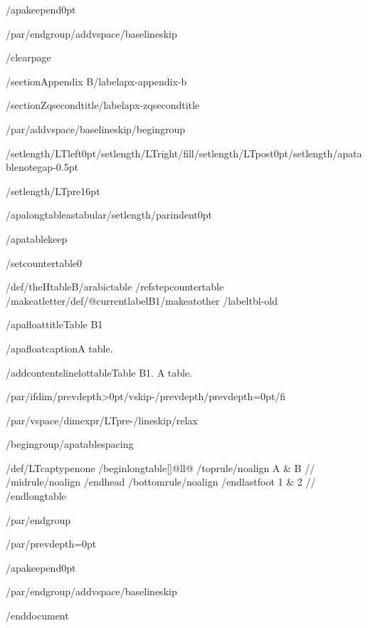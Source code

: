 /apakeepend{0pt}

/par/endgroup/addvspace{/baselineskip}

/clearpage

/section{Appendix B}/label{apx-appendix-b}

/section{Zqsecondtitle}/label{apx-zqsecondtitle}

/par/addvspace{/baselineskip}/begingroup

/setlength{/LTleft}{0pt}/setlength{/LTright}{/fill}/setlength{/LTpost}{0pt}/setlength{/apatablenotegap}{-0.5pt}

/setlength{/LTpre}{16pt}

/apalongtableastabular/setlength{/parindent}{0pt}

/apatablekeep

/setcounter{table}{0}

/def/theHtable{B/arabic{table}}%
/refstepcounter{table}%
/makeatletter/def/@currentlabel{B1}/makeatother%
/label{tbl-old}

/apafloattitle{Table B1}

/apafloatcaption{A table.}

/addcontentsline{lot}{table}{Table B1. A table.}

/par/ifdim/prevdepth>0pt/vskip-/prevdepth/prevdepth=0pt/fi

/par/vspace{/dimexpr/LTpre-/lineskip/relax}

/begingroup/apatablespacing

{/def/LTcaptype{none} %
/begin{longtable}[]{@{}ll@{}}
/toprule/noalign{}
A & B //
/midrule/noalign{}
/endhead
/bottomrule/noalign{}
/endlastfoot
1 & 2 //
/end{longtable}
}

/par/endgroup

/par/prevdepth=0pt

/apakeepend{0pt}

/par/endgroup/addvspace{/baselineskip}




/end{document}
